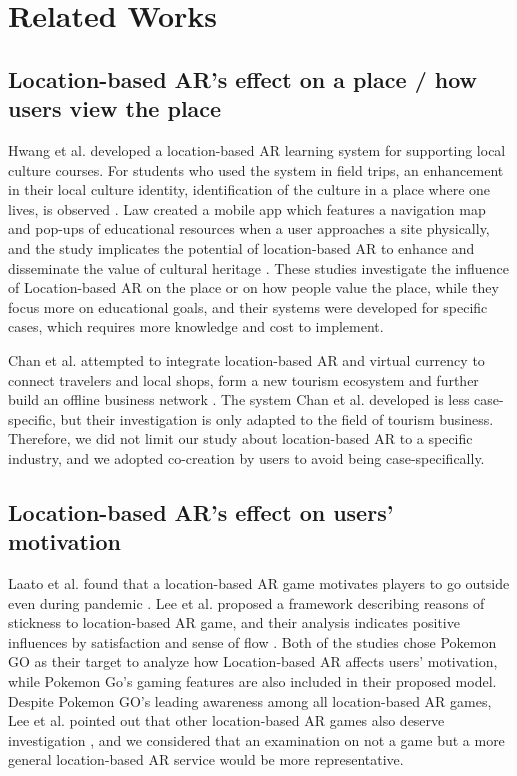 \chapter{Related Works} \label{ch:3}

\section{Location-based AR's effect on a place / how users view the place}
Hwang et al. developed a location-based AR learning system for supporting local culture courses.
For students who used the system in field trips, an enhancement in their local culture identity,
identification of the culture in a place where one lives, is observed \cite{hwang_chang_chen_chen_2017}.
Law created a mobile app which features a navigation map and pop-ups of educational resources when a user approaches a site physically,
and the study implicates the potential of location-based AR to enhance and disseminate the value of cultural heritage \cite{law_2018}.
These studies investigate the influence of Location-based AR on the place or on how people value the place,
while they focus more on educational goals, and their systems were developed for specific cases, which requires more knowledge and cost to implement.

Chan et al. attempted to integrate location-based AR and virtual currency to connect travelers and local shops,
form a new tourism ecosystem and further build an offline business network \cite{chan_lin_wang_lu_hsu_2017}.
The system Chan et al. developed is less case-specific, but their investigation is only adapted to the field of tourism business.
Therefore, we did not limit our study about location-based AR to a specific industry, and we adopted co-creation by users to avoid being case-specifically.

\section{Location-based AR's effect on users' motivation}
Laato et al. found that a location-based AR game motivates players to go outside even during pandemic \cite{laato_islam_laine_2020}.
Lee et al. proposed a framework describing reasons of stickness to location-based AR game,
and their analysis indicates positive influences by satisfaction and sense of flow \cite{lee_chiang_hsiao_2018}.
Both of the studies chose Pokemon GO as their target to analyze how Location-based AR affects users' motivation,
while Pokemon Go's gaming features are also included in their proposed model.
Despite Pokemon GO's leading awareness among all location-based AR games,
Lee et al. pointed out that other location-based AR games also deserve investigation \cite{lee_chiang_hsiao_2018},
and we considered that an examination on not a game but a more general location-based AR service would be more representative.


